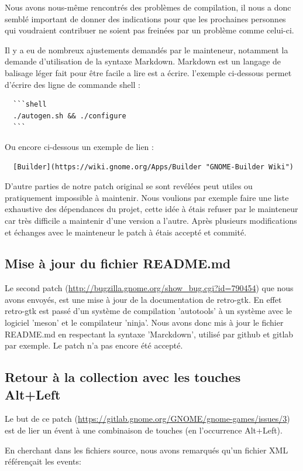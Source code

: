 \documentclass[12pt]{report}
\begin{document}
Nous avons nous-même rencontrés des problèmes de compilation, il nous a donc
semblé important de donner des indications pour que les prochaines personnes qui
voudraient contribuer ne soient pas freinées par un problème comme celui-ci.

Il y a eu de nombreux ajustements demandés par le mainteneur, notamment la demande
d'utilisation de la syntaxe Markdown.
Markdown est un langage de balisage léger fait pour être facile a lire est a écrire.
l'exemple ci-dessous permet d'écrire des ligne de commande shell :
\begin{verbatim}
  ```shell
  ./autogen.sh && ./configure
  ```
\end{verbatim}
Ou encore ci-dessous un exemple de lien :
\begin{verbatim}
  [Builder](https://wiki.gnome.org/Apps/Builder "GNOME-Builder Wiki")
\end{verbatim}

D'autre parties de notre patch original se sont revélées peut utiles ou pratiquement
impossible à maintenir. Nous voulions par exemple faire une liste exhaustive des
dépendances du projet, cette idée à étais refuser par le mainteneur car très
difficile a maintenir d'une version a l'autre.
Après plusieurs modifications et échanges avec le mainteneur le patch à étais
accepté et commité.

\subsection{Mise à jour du fichier README.md}
\label{README}
Le second patch (\url{http://bugzilla.gnome.org/show_bug.cgi?id=790454}) 
que nous avons envoyés, est une mise à jour de la documentation de retro-gtk.
En effet retro-gtk est passé d'un système de compilation 'autotools' à un
système avec le logiciel 'meson' et le compilateur 'ninja'.
Nous avons donc mis à jour le fichier README.md en respectant la syntaxe
'Marckdown', utilisé par github et gitlab par exemple.
Le patch n'a pas encore été accepté.

\subsection{Retour à la collection avec les touches Alt+Left}
Le but de ce patch (\url{https://gitlab.gnome.org/GNOME/gnome-games/issues/3})
est de lier un évent à une combinaison de touches (en l’occurrence Alt+Left).

En cherchant dans les fichiers source, nous avons remarqués qu'un
fichier XML référençait les events:
\end{document}
